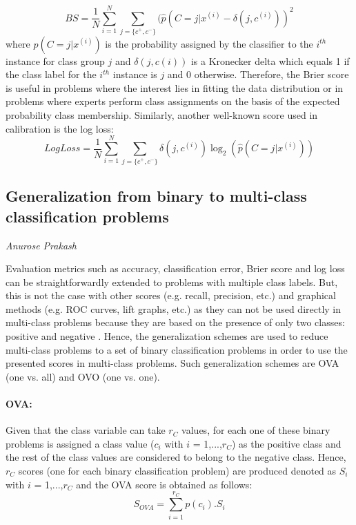 \begin{equation}
BS = \frac{1}{N} \sum_{i=1}^N \sum_{j= \{c^+, c^-\}}(\widehat{p}(C = j|x^{(i)} - \delta(j,c^{(i)}))^2  
\end{equation}
where $\widehat{p}(C = j|x^{(i)})$ is the probability assigned by the classifier to the $i^{th}$ instance for class group $j$ and $\delta(j, c(i))$ is a Kronecker delta which equals 1 if the class
label for the $i^{th}$ instance is $j$ and 0 otherwise. Therefore, the Brier score is useful in problems where the interest lies in fitting the data distribution or in problems where experts perform class assignments on the basis of the expected probability class membership. Similarly, another well-known score used in calibration is the log loss:
\begin{equation}
Log Loss = \frac{1}{N} \sum_{i=1}^N \sum_{j= \{c^+, c^-\}} \delta(j,c^{(i)}) \log_2(\widehat{p}(C = j|x^{(i)}))
\end{equation}


\subsection{Generalization from binary to multi-class classification problems}
\vspace*{-12mm}
\hfill{\normalsize\emph{Anurose Prakash}}\newline

Evaluation metrics such as accuracy, classification error, Brier score and log loss can be straightforwardly extended to problems with multiple class labels. But, this is not the case with other scores
(e.g. recall, precision, etc.) and graphical methods (e.g. ROC curves, lift graphs,
etc.) as they can not be used directly in multi-class problems because they are based on
the presence of only two classes: positive and negative \cite{article}. Hence, the generalization schemes are used to reduce multi-class problems to a set of binary classification problems in order to use the presented scores in multi-class problems. Such
generalization schemes are OVA (one vs. all) and OVO (one vs. one).
\paragraph{OVA:}
Given that the class variable can take $r_C$ values, for each one of these binary problems is assigned a class value ($c_i$ with $i$ = 1,...,$r_C$) as the positive class and the rest of the class values are considered to belong to the negative class. Hence, $r_C$ scores (one for each binary classification problem) are produced denoted as $S_i$ with $i$ = 1,...,$r_C$ and the OVA score is obtained as follows:
\begin{equation}
    S_{OVA} = \sum_{i=1}^{r_C} p(c_i) . S_i
\end{equation}

